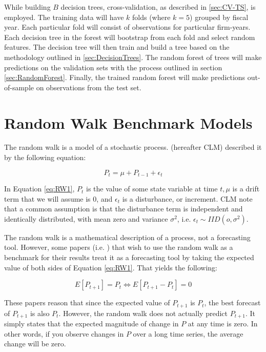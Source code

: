 While building \(B\) decision trees,  cross-validation, as described in \ref{sec:CV-TS}, is employed. The training data will have \(k\) folds (where \(k=5\)) grouped by fiscal year.  Each particular fold will consist of observations for particular firm-years.  Each decision tree in the forest will bootstrap from each fold and select random features. The decision tree will then train and build a tree based on the methodology outlined in \ref{sec:DecisionTrees}. The random forest of trees will make predictions on the validation sets with the process outlined in section \ref{sec:RandomForest}. Finally, the trained random forest will  make predictions out-of-sample on observations from the test set.

\section{Random Walk Benchmark Models} \label{sec:RWModel}

The random walk is a model of a stochastic process.  \cite{Campbell1997} (hereafter CLM)  described it by the following equation: 

\begin{equation}
\label{eq:RW1}
P_t = \mu + P_{t-1} + \epsilon_t 
\end{equation}

\noindent In Equation \ref{eq:RW1}, \(P_t\) is the value of some state variable at time \(t, \mu\) is a drift term that we will assume is 0, and \(\epsilon_t\) is a disturbance, or increment.  CLM note that a common assumption is that the disturbance term is independent and identically distributed, with mean zero and variance \(\sigma^2\),  i.e.  \( \epsilon_t \sim IID(o,\sigma^2)\). 

The random walk is a mathematical description of a process, not a forecasting tool. However, some papers (i.e.  \cite{Bradshaw}) that wish to use the random walk as a benchmark for their results treat it as a forecasting tool by taking the expected value of both sides of Equation  \ref{eq:RW1}. That yields the following:

\begin{equation}
\label{eq:RW2}
E[P_{t+1}] = P_t \Leftrightarrow E[P_{t+1} - P_t] = 0
\end{equation}

\noindent These papers reason that since the expected value of \(P_{t+1}\) is \(P_t\), the best forecast of \(P_{t+1}\) is also \(P_t\). However, the random walk does not actually predict \(P_{t+1}\). It simply states that the expected magnitude of change in \(P\) at any time is zero. In other words, if you observe changes in \(P\) over a long time series, the average change will be zero.

